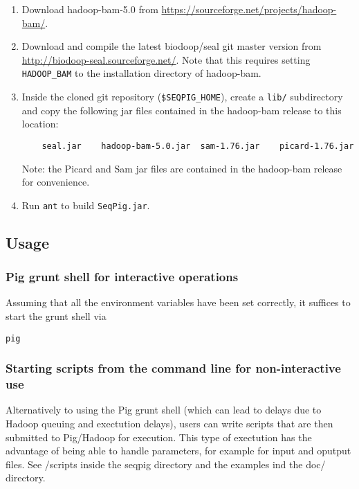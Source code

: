 \documentclass[a4paper,10pt,bibtotoc,abstracton,oneside,noindent,DIV15]{scrartcl}
\begin{document}
\begin{enumerate}
\item Download hadoop-bam-5.0 from \url{https://sourceforge.net/projects/hadoop-bam/}.

\item Download and compile the latest biodoop/seal git master version from
 \url{http://biodoop-seal.sourceforge.net/}. Note that this requires
 setting {\tt HADOOP\_BAM} to the installation directory of hadoop-bam.

\item Inside the cloned git repository ({\tt \$SEQPIG\_HOME}), create a
{\tt lib/} subdirectory and copy the following jar files contained in the
hadoop-bam release to this location:
%
\begin{lstlisting} 
    seal.jar	hadoop-bam-5.0.jar	sam-1.76.jar	picard-1.76.jar
\end{lstlisting}
%
Note: the Picard and Sam jar files are contained in the hadoop-bam release
for convenience.

\item Run {\tt ant} to build {\tt SeqPig.jar}.
\end{enumerate}

\subsection{Usage}

\subsubsection{Pig grunt shell for interactive operations}
Assuming that all the environment variables have been set correctly, it suffices
to start the grunt shell via
%
\begin{lstlisting}
pig
\end{lstlisting}
%
\subsubsection{Starting scripts from the command line for non-interactive use}
Alternatively to using the Pig grunt shell (which can lead to delays due to
Hadoop queuing and exectution delays), users can write scripts that are
then submitted to Pig/Hadoop for execution. This type of exectution has
the advantage of being able to handle parameters, for example for input
and oputput files. See /scripts inside the seqpig directory and the
examples ind the doc/ directory.
\end{document}
